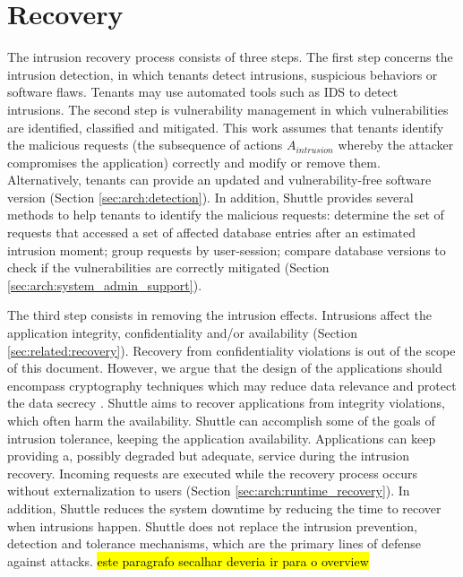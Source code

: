 \section{Recovery}
\label{sec:arch:recovery}
The intrusion recovery process consists of three steps. The first step concerns the intrusion detection, in which tenants detect intrusions, suspicious behaviors or software flaws. Tenants may use automated tools such as \acf{IDS} \cite{itdb} to detect intrusions. The second step is vulnerability management in which vulnerabilities are identified, classified and mitigated. This work assumes that tenants identify the malicious requests (the subsequence of actions $A_{intrusion}$ whereby the attacker compromises the application) correctly and modify or remove them. Alternatively, tenants can provide an updated and vulnerability-free software version (Section \ref{sec:arch:detection}).
In addition, Shuttle provides several methods to help tenants to identify the malicious requests: determine the set of requests that accessed a set of affected database entries  after an estimated intrusion moment; group requests by user-session; compare database versions to check if the vulnerabilities are correctly mitigated (Section \ref{sec:arch:system_admin_support}). 

The third step consists in removing the intrusion effects. Intrusions affect the application integrity, confidentiality and/or availability (Section \ref{sec:related:recovery}). Recovery from confidentiality violations is out of the scope of this document. However, we argue that the design of the applications should encompass cryptography techniques which may reduce data relevance and protect the data secrecy \cite{Maheshwari2000}.
Shuttle aims to recover applications from integrity violations, which often harm the availability. Shuttle can accomplish some of the goals of intrusion tolerance, keeping the application availability. Applications can keep providing a, possibly degraded but adequate, service during the intrusion recovery. Incoming requests are executed while the recovery process occurs without externalization to users (Section \ref{sec:arch:runtime_recovery}). In addition, Shuttle reduces the system downtime by reducing the time to recover when intrusions happen. Shuttle does not replace the intrusion prevention, detection and tolerance mechanisms, which are the primary lines of defense against attacks. \hl{este paragrafo secalhar deveria ir para o overview} \\

